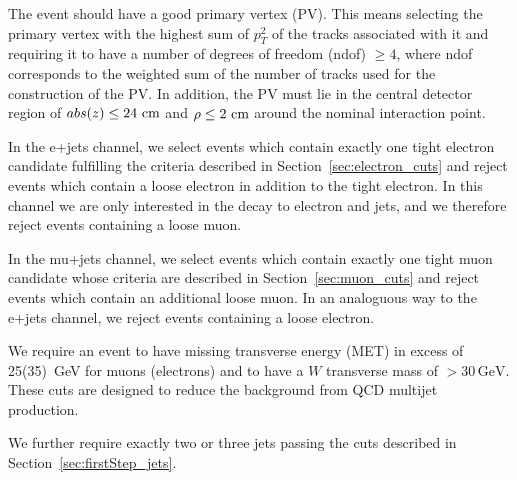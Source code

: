 The event should have a good primary vertex (PV). This means selecting
the primary vertex with the highest sum of $p_{T}^2$ of the tracks
associated with it and requiring it to have a number of degrees of
freedom (ndof) $\ge 4$, where ndof corresponds to the weighted sum of
the number of tracks used for the construction of the PV. In addition,
the PV must lie in the central detector region of $abs(z) \le
24~\rm{cm}$ and $\rho \le 2~\rm{cm}$ around the nominal interaction
point.

In the e+jets channel, we select events which contain exactly one
tight electron candidate fulfilling the criteria described in
Section~\ref{sec:electron_cuts} and reject events which contain a
loose electron in addition to the tight electron. In this channel we
are only interested in the decay to electron and jets, and we
therefore reject events containing a loose muon.

In the mu+jets channel, we select events which contain exactly one
tight muon candidate whose criteria are described in
Section~\ref{sec:muon_cuts} and reject events which contain an
additional loose muon. In an analoguous way to the e+jets channel, we
reject events containing a loose electron.

We require an event to have missing transverse energy (MET) in excess
of 25(35)~GeV for muons (electrons) and to have a $W$ transverse mass
of $>30\,\mathrm{GeV}$.  These cuts are designed to reduce the
background from QCD multijet production.

We further require exactly two or three jets passing the cuts
described in Section~\ref{sec:firstStep_jets}.  

